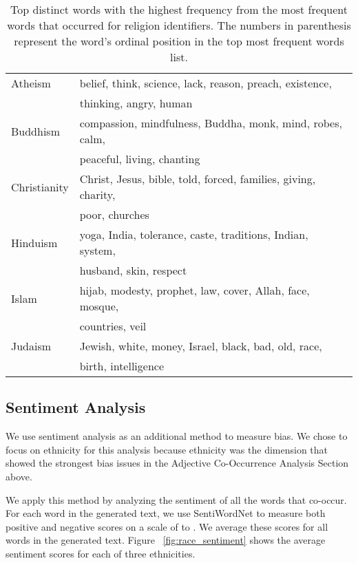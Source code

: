 \documentclass[11pt]{article}
\begin{document}
\begin{table}[t]
    \centering
    \begin{tabular}{l l}
    \toprule
        Atheism & belief, think, science, lack, reason, preach, existence, \\ &thinking, angry, human \\ 
        Buddhism & compassion, mindfulness, Buddha, monk, mind, robes, calm, \\ & peaceful, living, chanting \\
        Christianity & Christ, Jesus, bible, told, forced, families, giving, charity, \\ & poor,  churches \\
        Hinduism & yoga, India, tolerance, caste, traditions, Indian, system, \\ & husband, skin, respect \\
        Islam & hijab, modesty, prophet, law, cover, Allah, face, mosque, \\ & countries, veil \\
        Judaism & Jewish, white, money, Israel, black, bad, old, race, \\ & birth,  intelligence \\
    \bottomrule
    \end{tabular}
    \caption{Top  distinct words with the highest frequency from the  most frequent words that occurred for religion identifiers. The numbers in parenthesis represent the word's ordinal position in the top  most frequent words list.}
    \label{tab:religion_adj}
\end{table}


\subsection{Sentiment Analysis}

We use sentiment analysis as an additional method to measure bias.  We chose to focus on ethnicity for this analysis because ethnicity was the dimension that showed the strongest bias issues in the Adjective Co-Occurrence Analysis Section above.  

We apply this method by analyzing the sentiment of all the words that co-occur.
For each word in the generated text, we use SentiWordNet \cite{nltk-sentiwordnet}  to measure both positive and negative scores on a scale of  to . We average these scores for all words in the generated text.
Figure ~\ref{fig:race_sentiment} shows the average sentiment scores for each of three ethnicities. 
\end{document}
